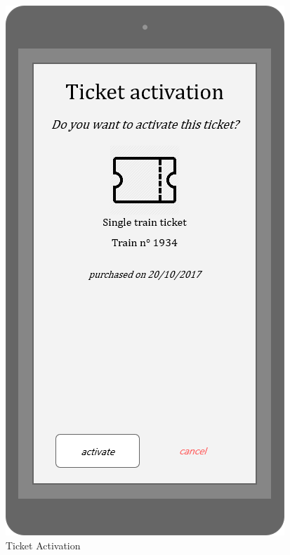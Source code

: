 \documentclass{article}
\begin{document}
\begin{figure}[H]
  \includegraphics[width=\linewidth]{04-Ticket_activation.png}
  \caption{Ticket Activation}\label{fig:MU13}
\endminipage\hfill
{}

\end{figure}
\end{document}
